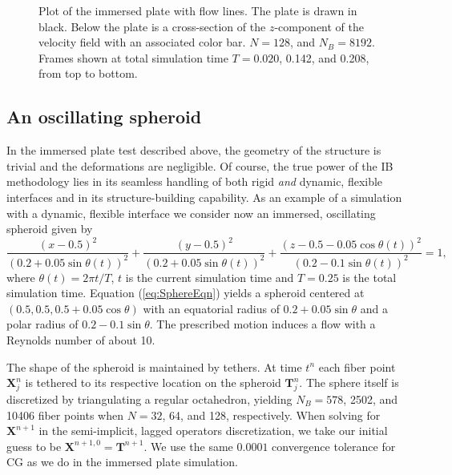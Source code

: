 \documentclass[preprint,12pt]{elsarticle}
\newcommand{\B}[1]{\mathbf{#1}}
\begin{document}
\begin{figure}[htb]
\begin{center}
	\end{center}
	\caption{\small Plot of the immersed plate with flow lines. The plate is drawn in black. Below the plate is a cross-section of the $z$-component of the velocity field with an associated color bar. $N=128$, and $N_B=8192$. Frames shown at total simulation time $T=0.020$, 0.142, and 0.208, from top to bottom.}
\label{fig:TimeProgression_Plate}
\end{figure}


\subsection{An oscillating spheroid}

In the immersed plate test described above, the geometry of the structure is trivial and the deformations are negligible. 
Of course, the true power of the IB methodology lies in its seamless handling of both rigid {\em and} dynamic, flexible interfaces and in its structure-building capability. As an example of a simulation with a dynamic, flexible  interface we consider now an immersed, oscillating spheroid
given by
\begin{equation}
\frac{(x-0.5)^2}{(0.2+0.05\sin\theta(t))^2} +
\frac{(y-0.5)^2}{(0.2+0.05\sin\theta(t))^2} +
\frac{(z-0.5-0.05\cos\theta(t))^2}{(0.2-0.1\sin\theta(t))^2} = 1,
\label{eq:SphereEqn}
\end{equation}
where $\theta(t) = 2\pi t/T$, $t$ is the current simulation time and $T=0.25$ is the total simulation time. Equation (\ref{eq:SphereEqn}) yields a spheroid centered at $(0.5,0.5,0.5+0.05\cos\theta)$ with an equatorial radius of $0.2+0.05\sin\theta$ and a polar radius of $0.2-0.1\sin\theta$.
The prescribed motion induces a flow with a Reynolds number of about 10.

The shape of the spheroid is maintained by tethers. At time $t^n$ each fiber point $\B{X}^n_j$ is tethered to its respective location on the spheroid $\B{T}^n_j$. The sphere itself is discretized by triangulating a regular octahedron, yielding $N_B=578$, 2502, and 10406 fiber points when $N=32$, 64, and 128,  respectively. When solving for $\B{X}^{n+1}$ in the semi-implicit, lagged operators discretization, we take our initial guess to be $\B{X}^{n+1,0}=\B{T}^{n+1}$.
We use the same $0.0001$ convergence tolerance for CG as we do in the immersed plate simulation.
\end{document}

